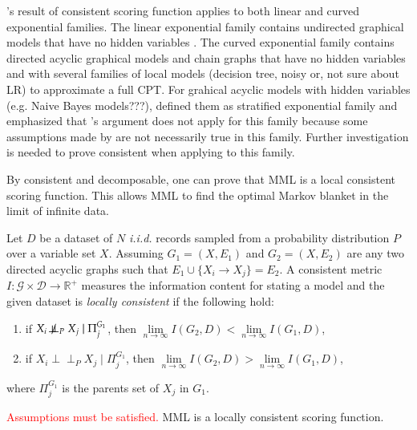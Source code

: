 \begin{remark}
\cite{haughton1988choice}'s result of consistent scoring function applies to both linear and curved exponential families. The linear exponential family contains undirected graphical models that have no hidden variables \cite{geiger2001stratified}. The curved exponential family contains directed acyclic graphical models and chain graphs that have no hidden variables and with several families of local models (decision tree, noisy or, not sure about LR) to approximate a full CPT. For grahical acyclic models with hidden variables (e.g. Naive Bayes models???), \cite{geiger2001stratified} defined them as stratified exponential family and emphasized that \cite{haughton1988choice}'s argument does not apply for this family because some assumptions made by \citeauthor{haughton1988choice} are not necessarily true in this family. Further investigation is needed to prove consistent when applying to this family. 
\end{remark}

By consistent and decomposable, one can prove that MML is a local consistent scoring function. This allows MML to find the optimal Markov blanket in the limit of infinite data. 
\begin{definition}
\label{def:local_consistent}
Let $D$ be a dataset of $N$ \textit{i.i.d.} records sampled from a probability distribution $P$ over a variable set $X$. Assuming $G_1 = (X, E_1)$ and $G_2 = (X, E_2)$ are any two directed acyclic graphs such that $E_1 \cup \{X_i \rightarrow X_j\} = E_2$. A consistent metric $I:\mathcal{G} \times \mathcal{D} \rightarrow \mathbb{R}^+$ measures the information content for stating a model and the given dataset is \textit{locally consistent} if the following hold: 
\begin{enumerate}
\item if $X_i \not\!\perp\!\!\!\perp_P X_j \mid \Pi_j^{G_1}$, then $\lim\limits_{n\rightarrow \infty} I(G_2, D) < \lim\limits_{n\rightarrow \infty}I(G_1, D)$,
\item if $X_i \!\perp\!\!\!\perp_P X_j \mid \Pi_j^{G_1}$, then $\lim\limits_{n\rightarrow \infty}I(G_2, D) > \lim\limits_{n\rightarrow \infty}I(G_1, D)$,
\end{enumerate}
where $\Pi_j^{G_1}$ is the parents set of $X_j$ in $G_1$. 
\end{definition}

\begin{proposition}
\textcolor{red}{Assumptions must be satisfied.} MML is a locally consistent scoring function. 
\end{proposition}

